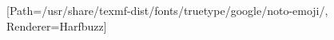 \usepackage{newunicodechar}

[Path=/usr/share/texmf-dist/fonts/truetype/google/noto-emoji/, Renderer=Harfbuzz]
